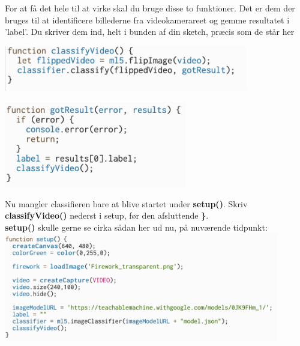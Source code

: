 \documentclass{ucph-handout}
\begin{document}
\newpage


\begin{exercisebox}[adjusted title= Vi er der næsten nu]

For at få det hele til at virke skal du bruge disse to funktioner. Det er dem der bruges til at identificere billederne fra videokamerareet og gemme resultatet i 'label'. Du skriver dem ind, helt i bunden af din sketch, præcis som de står her
\vspace{3mm}
\vspace{3mm}

\includegraphics[width=0.8\textwidth]{billeder/classifyvideo.png} \\

\vspace{3mm}

\includegraphics[width=0.6\textwidth]{billeder/gotresult.png} \\

\vspace{3mm}


Nu mangler classifieren bare at blive startet under \textbf{setup()}. Skriv \textbf{classifyVideo()} nederst i setup, før den afsluttende \textbf{\}}.
\\

\textbf{setup()} skulle gerne se cirka sådan her ud nu, på nuværende tidpunkt: \\

\includegraphics[width=0.9\textwidth]{nyebilleder/helesetup.png} \\

\end{exercisebox}
\end{document}

